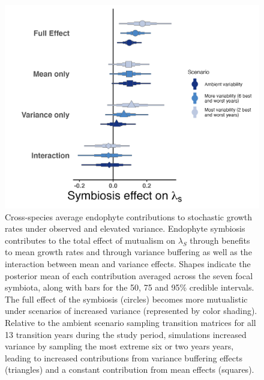 \documentclass[lineno,sn-nature]{sn-jnl}%
\providecommand{\DIFaddbeginFL}{} %
\providecommand{\DIFaddendFL}{} %
\providecommand{\DIFdelbeginFL}{} %
\providecommand{\DIFdelendFL}{} %
\newcommand{\DIFscaledelfig}{0.5}
\newlength{\DIFdelgraphicswidth} %
\newlength{\DIFdelgraphicsheight} %
\newcommand{\DIFaddincludegraphics}[2][]{{\color{blue}\fbox{\DIFOincludegraphics[#1]{#2}}}} %
\newcommand{\DIFdelincludegraphics}[2][]{%
\sbox{\DIFdelgraphicsbox}{\DIFOincludegraphics[#1]{#2}}%
\settoboxwidth{\DIFdelgraphicswidth}{\DIFdelgraphicsbox} %
\settoboxtotalheight{\DIFdelgraphicsheight}{\DIFdelgraphicsbox} %
\scalebox{\DIFscaledelfig}{%
\parbox[b]{\DIFdelgraphicswidth}{\usebox{\DIFdelgraphicsbox}\\[-\baselineskip] \rule{\DIFdelgraphicswidth}{0em}}\llap{\resizebox{\DIFdelgraphicswidth}{\DIFdelgraphicsheight}{%
\setlength{\unitlength}{\DIFdelgraphicswidth}%
\begin{picture}(1,1)%
\thicklines\linethickness{2pt} %
{\color[rgb]{1,0,0}\put(0,0){\framebox(1,1){}}}%
{\color[rgb]{1,0,0}\put(0,0){\line( 1,1){1}}}%
{\color[rgb]{1,0,0}\put(0,1){\line(1,-1){1}}}%
\end{picture}%
}\hspace*{3pt}}} %
} %
\DeclareRobustCommand{\DIFaddbeginFL}{\DIFOaddbeginFL \let\includegraphics\DIFaddincludegraphics} %
\DeclareRobustCommand{\DIFaddendFL}{\DIFOaddendFL \let\includegraphics\DIFOincludegraphics} %
\DeclareRobustCommand{\DIFdelbeginFL}{\DIFOdelbeginFL \let\includegraphics\DIFdelincludegraphics} %
\DeclareRobustCommand{\DIFdelendFL}{\DIFOaddendFL \let\includegraphics\DIFOincludegraphics} %
\begin{document}
\begin{figure}
	\centering
	\DIFdelbeginFL %
\DIFdelendFL \DIFaddbeginFL \includegraphics[width=.8\linewidth]{StochDemo_newFig5.png}
	\DIFaddendFL \caption{Cross-species average endophyte contributions to stochastic growth rates under observed and elevated variance. Endophyte symbiosis contributes to the total effect of mutualism on $\lambda_{S}$ through benefits to mean growth rates and through variance buffering as well as the interaction between mean and variance effects. Shapes indicate the posterior mean of each contribution averaged across the seven focal symbiota, along with bars for the 50, 75 and 95\% credible intervals.  The full effect of the symbiosis (circles) becomes more mutualistic under scenarios of increased variance (represented by color shading). Relative to the ambient scenario sampling transition matrices for all 13 transition years during the study period, simulations increased variance by sampling the most extreme six or two years years, leading to increased contributions from variance buffering effects (triangles) and a constant contribution from mean effects (squares).}
\end{figure}



\clearpage
\end{document}
